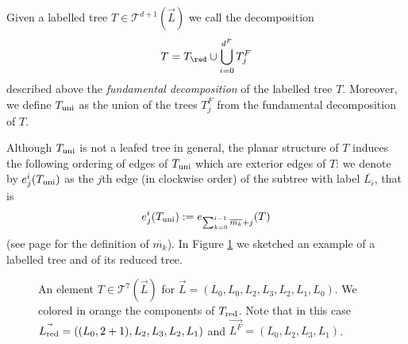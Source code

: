 \begin{dfn}
	Given a labelled tree $T\in \mathcal{T}^{d+1}(\vec{L})$ we call the decomposition $$T=T_\red \cup \bigcup_{i=0}^{d^F} T_j^F$$ described above the \textit{fundamental decomposition} of the labelled tree $T$. Moreover, we define $T_\textnormal{uni}$ as the union of the trees $T^F_j$ from the fundamental decomposition of $T$.
\end{dfn}  \noindent Although $T_\textnormal{uni}$ is not a leafed tree in general, the planar structure of $T$ induces the following ordering of edges of $T_\textnormal{uni}$ which are exterior edges of $T$: we denote by $e^i_j(T_\textnormal{uni})$ as the $j$th edge (in clockwise order) of the subtree with label $\overline{L_i}$, that is
$$e_j^i(T_\textnormal{uni}):=e_{\sum_{k=0}^{i-1}\overline{m_k}+j}(T)$$ (see page \pageref{defofmis} for the definition of $\overline{m_k}$). In Figure \ref{fig:extree} we sketched an example of a labelled tree and of its reduced tree.
\begin{center}
	\begin{figure}
		\caption{An element $T\in\mathcal{T}^{7}(\vec{L})$ for $\vec{L}=(L_0, L_0,L_2,L_3,L_2,L_1,L_0)$. We colored in orange the components of $T_\textnormal{red}$.  Note that in this case $\vec{L_\textnormal{red}}=((L_0,2+1),L_2,L_3,L_2,L_1)$ and $\vec{L^F}= (L_0,L_2,L_3,L_1)$.} \label{fig:extree}
	\end{figure}
\end{center}
